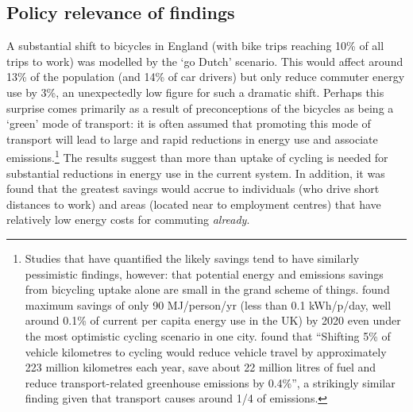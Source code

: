\subsection{Policy relevance of findings}
A substantial shift to bicycles in England (with bike
trips reaching 10\% of all trips to work) was modelled by the `go Dutch' scenario.
This would affect around 13\% of the population (and 14\% of car drivers)
but only reduce commuter energy use by 3\%, an unexpectedly low figure for
such a dramatic shift.
Perhaps this surprise comes primarily as a result of preconceptions of the
bicycles as being a `green' mode of transport: it is
often assumed that promoting this mode of transport will lead to
large and rapid reductions in energy use and associate
emissions.\footnote{Studies
that
have quantified the likely savings tend to have similarly pessimistic
findings, however: that potential energy and emissions savings from bicycling
uptake alone are small in the grand scheme of things. \citet{Lovelace2011-assessing}
found maximum savings of only 90 MJ/person/yr (less than 0.1 kWh/p/day, well
around 0.1\% of current per capita energy use in the UK) by 2020 even under
the most optimistic cycling scenario in one city. \citet{Lindsay2011}
found that ``Shifting 5\% of vehicle kilometres to cycling would reduce
vehicle travel by approximately 223 million kilometres each year, save
about 22 million litres of fuel and reduce transport-related greenhouse emissions
by 0.4\%'', a strikingly similar finding given that transport
causes around 1/4 of emissions. 
}
The
results suggest than more than uptake of cycling
is needed for substantial reductions in energy use in the current system.
In addition, it was found that the greatest savings would accrue to individuals
(who drive short distances to work) and areas (located near to employment
centres) that have relatively low energy costs for commuting \emph{already}.

